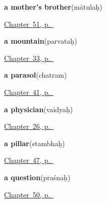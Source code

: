 \noindent\begin{minipage}[t]{\linewidth}
\raggedright
\textbf{a mother's brother}\enspace\emph{}\enspace(mātulaḥ)\par
\footnotesize \hyperref[ch:sa-family-more]{Chapter~51, p.~\pageref*{ch:sa-family-more}}
\end{minipage}\par\smallskip

\noindent\begin{minipage}[t]{\linewidth}
\raggedright
\textbf{a mountain}\enspace\emph{}\enspace(parvataḥ)\par
\footnotesize \hyperref[ch:sa-land]{Chapter~33, p.~\pageref*{ch:sa-land}}
\end{minipage}\par\smallskip

\noindent\begin{minipage}[t]{\linewidth}
\raggedright
\textbf{a parasol}\enspace\emph{}\enspace(chatram)\par
\footnotesize \hyperref[ch:sa-things-people-make]{Chapter~41, p.~\pageref*{ch:sa-things-people-make}}
\end{minipage}\par\smallskip

\noindent\begin{minipage}[t]{\linewidth}
\raggedright
\textbf{a physician}\enspace\emph{}\enspace(vaidyaḥ)\par
\footnotesize \hyperref[ch:sa-roles]{Chapter~26, p.~\pageref*{ch:sa-roles}}
\end{minipage}\par\smallskip

\noindent\begin{minipage}[t]{\linewidth}
\raggedright
\textbf{a pillar}\enspace\emph{}\enspace(stambhaḥ)\par
\footnotesize \hyperref[ch:sa-parts-of-a-house]{Chapter~47, p.~\pageref*{ch:sa-parts-of-a-house}}
\end{minipage}\par\smallskip

\noindent\begin{minipage}[t]{\linewidth}
\raggedright
\textbf{a question}\enspace\emph{}\enspace(praśnaḥ)\par
\footnotesize \hyperref[ch:sa-sound-and-song]{Chapter~50, p.~\pageref*{ch:sa-sound-and-song}}
\end{minipage}\par\smallskip

